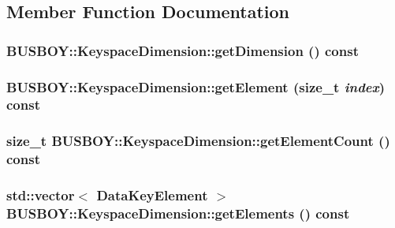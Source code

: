 \subsection{Member Function Documentation}
\hypertarget{classBUSBOY_1_1KeyspaceDimension_abceed9c7182f44afebf7b8e491224121}{
\subsubsection[{getDimension}]{ BUSBOY::KeyspaceDimension::getDimension () const}}
\label{classBUSBOY_1_1KeyspaceDimension_abceed9c7182f44afebf7b8e491224121}
\hypertarget{classBUSBOY_1_1KeyspaceDimension_a9dd72c349a2aed3cc8c2ff500986d269}{
\subsubsection[{getElement}]{ BUSBOY::KeyspaceDimension::getElement (size\_\-t {\em index}) const}}
\label{classBUSBOY_1_1KeyspaceDimension_a9dd72c349a2aed3cc8c2ff500986d269}
\hypertarget{classBUSBOY_1_1KeyspaceDimension_a6e1b8fdd51cc3437e35e3f65162c053f}{
\subsubsection[{getElementCount}]{\setlength{\rightskip}{0pt plus 5cm}size\_\-t BUSBOY::KeyspaceDimension::getElementCount () const}}
\label{classBUSBOY_1_1KeyspaceDimension_a6e1b8fdd51cc3437e35e3f65162c053f}
\hypertarget{classBUSBOY_1_1KeyspaceDimension_ad15e4b096758991e184f7eda1e508ea9}{
\subsubsection[{getElements}]{\setlength{\rightskip}{0pt plus 5cm}std::vector$<$ {\bf DataKeyElement} $>$ BUSBOY::KeyspaceDimension::getElements () const}}
\label{classBUSBOY_1_1KeyspaceDimension_ad15e4b096758991e184f7eda1e508ea9}


